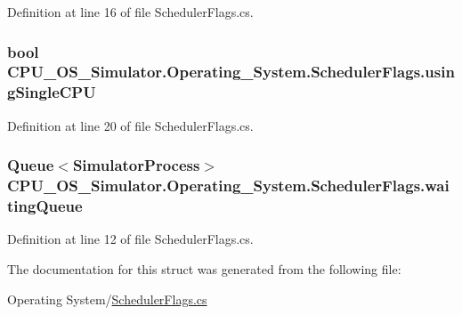 Definition at line 16 of file Scheduler\+Flags.\+cs.

\hypertarget{struct_c_p_u___o_s___simulator_1_1_operating___system_1_1_scheduler_flags_a7b42d8ef49035b7d450032a1e4060fb6}{}
\subsubsection[{using\+Single\+C\+P\+U}]{\setlength{\rightskip}{0pt plus 5cm}bool C\+P\+U\+\_\+\+O\+S\+\_\+\+Simulator.\+Operating\+\_\+\+System.\+Scheduler\+Flags.\+using\+Single\+C\+P\+U}\label{struct_c_p_u___o_s___simulator_1_1_operating___system_1_1_scheduler_flags_a7b42d8ef49035b7d450032a1e4060fb6}


Definition at line 20 of file Scheduler\+Flags.\+cs.

\hypertarget{struct_c_p_u___o_s___simulator_1_1_operating___system_1_1_scheduler_flags_acd01af6379302599c522a0331a6276fc}{}
\subsubsection[{waiting\+Queue}]{\setlength{\rightskip}{0pt plus 5cm}Queue$<${\bf Simulator\+Process}$>$ C\+P\+U\+\_\+\+O\+S\+\_\+\+Simulator.\+Operating\+\_\+\+System.\+Scheduler\+Flags.\+waiting\+Queue}\label{struct_c_p_u___o_s___simulator_1_1_operating___system_1_1_scheduler_flags_acd01af6379302599c522a0331a6276fc}


Definition at line 12 of file Scheduler\+Flags.\+cs.



The documentation for this struct was generated from the following file\+:\begin{DoxyCompactItemize}
\item 
Operating System/\hyperlink{_scheduler_flags_8cs}{Scheduler\+Flags.\+cs}\end{DoxyCompactItemize}
